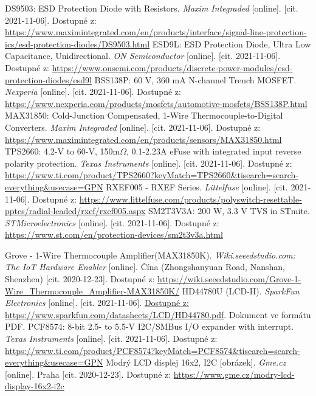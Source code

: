 \begin{thebibliography}{3}
DS9503: ESD Protection Diode with Resistors. \textit{Maxim Integraded} [online]. [cit. 2021-11-06]. Dostupné z: \url{https://www.maximintegrated.com/en/products/interface/signal-line-protection-ics/esd-protection-diodes/DS9503.html}
ESD9L: ESD Protection Diode, Ultra Low Capacitance, Unidirectional. \textit{ON Semiconductor} [online]. [cit. 2021-11-06]. Dostupné z: \url{https://www.onsemi.com/products/discrete-power-modules/esd-protection-diodes/esd9l}
BSS138P: 60 V, 360 mA N-channel Trench MOSFET. \textit{Nexperia} [online]. [cit. 2021-11-06]. Dostupné z: \url{https://www.nexperia.com/products/mosfets/automotive-mosfets/BSS138P.html}
MAX31850: Cold-Junction Compensated, 1-Wire Thermocouple-to-Digital Converters. \textit{Maxim Integraded} [online]. [cit. 2021-11-06]. Dostupné z: \url{https://www.maximintegrated.com/en/products/sensors/MAX31850.html}
TPS2660: 4.2-V to 60-V, 150m$\Omega$, 0.1-2.23A eFuse with integrated input reverse polarity protection. \textit{Texas Instruments} [online]. [cit. 2021-11-06]. Dostupné z: \url{https://www.ti.com/product/TPS2660?keyMatch=TPS2660&tisearch=search-everything&usecase=GPN}
RXEF005 - RXEF Series. \textit{Littelfuse} [online]. [cit. 2021-11-06]. Dostupné z: \url{https://www.littelfuse.com/products/polyswitch-resettable-pptcs/radial-leaded/rxef/rxef005.aspx}
SM2T3V3A: 200 W, 3.3 V TVS in STmite. \textit{STMicroelectronics} [online]. [cit. 2021-11-06]. Dostupné z: \url{https://www.st.com/en/protection-devices/sm2t3v3a.html}

Grove - 1-Wire Thermocouple Amplifier(MAX31850K). \textit{Wiki.seeedstudio.com: The IoT Hardware Enabler} [online]. Čína (Zhongshanyuan Road, Nanshan, Shenzhen) [cit. 2020-12-23]. Dostupné z: \url{https://wiki.seeedstudio.com/Grove-1-Wire\_Thermocouple\_Amplifier-MAX31850K/}
HD44780U (LCD-II). \textit{SparkFun Electronics} [online]. [cit. 2021-11-06]. \url{Dostupné z: https://www.sparkfun.com/datasheets/LCD/HD44780.pdf}. Dokument ve formátu PDF.
PCF8574: 8-bit 2.5- to 5.5-V I2C/SMBus I/O expander with interrupt. \textit{Texas Instruments} [online]. [cit. 2021-11-06]. Dostupné z: \url{https://www.ti.com/product/PCF8574?keyMatch=PCF8574&tisearch=search-everything&usecase=GPN}
Modrý LCD displej 16x2, I2C [obrázek]. \textit{Gme.cz} [online]. Praha [cit. 2020-12-23]. Dostupné z: \url{https://www.gme.cz/modry-lcd-display-16x2-i2c}


\end{thebibliography}
